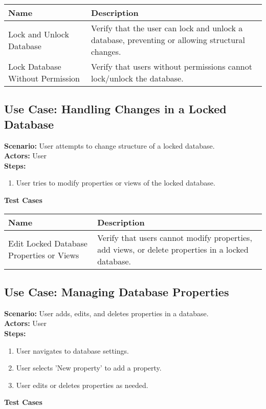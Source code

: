 \documentclass{article}
\begin{document}
            \begin{longtable}{|p{}|p{}|}
            \hline
            \textbf{Name} & \textbf{Description} \\
            \hline
            Lock and Unlock Database & Verify that the user can lock and unlock a database, preventing or allowing structural changes. \\
\hline
Lock Database Without Permission & Verify that users without permissions cannot lock/unlock the database. \\
\hline
\end{longtable}\subsection{\textbf{Use Case: Handling Changes in a Locked Database}}
\textbf{Scenario:} User attempts to change structure of a locked database.\\
\textbf{Actors:} User\\
\textbf{Steps:}
\begin{enumerate}
\item User tries to modify properties or views of the locked database.
\end{enumerate}
\textbf{Test Cases}

            \begin{longtable}{|p{}|p{}|}
            \hline
            \textbf{Name} & \textbf{Description} \\
            \hline
            Edit Locked Database Properties or Views & Verify that users cannot modify properties, add views, or delete properties in a locked database. \\
\hline
\end{longtable}\subsection{\textbf{Use Case: Managing Database Properties}}
\textbf{Scenario:} User adds, edits, and deletes properties in a database.\\
\textbf{Actors:} User\\
\textbf{Steps:}
\begin{enumerate}
\item User navigates to database settings.
\item User selects 'New property' to add a property.
\item User edits or deletes properties as needed.
\end{enumerate}
\textbf{Test Cases}
\end{document}
